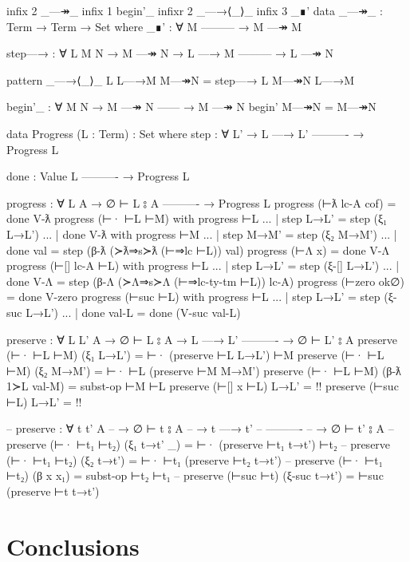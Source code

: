 \documentclass[logo,bsc,singlespacing,parskip,online]{infthesis}
\renewenvironment{code}{\mintedcopy[breaklines,breaksymbolleft=\;]{agda}}{\endmintedcopy}
\begin{document}
\begin{code}
  infix  2 _—↠_
  infix  1 begin'_
  infixr 2 _—→⟨_⟩_
  infix  3 _∎'
  data _—↠_ : Term → Term → Set where
    _∎' : ∀ M
        ---------
      → M —↠ M

    step—→ : ∀ L {M N}
      → M —↠ N
      → L —→ M
        ---------
      → L —↠ N

  pattern _—→⟨_⟩_ L L—→M M—↠N = step—→ L M—↠N L—→M

  begin'_ : ∀ {M N}
    → M —↠ N
      ------
    → M —↠ N
  begin' M—↠N = M—↠N
\end{code}

\begin{code}
  data Progress (L : Term) : Set where
    step : ∀ {L'}
      → L —→ L'
        ----------
      → Progress L

    done :
        Value L
        ----------
      → Progress L

  progress : ∀ {L A}
    → ∅ ⊢ L ⦂ A
      ----------
    → Progress L
  progress (⊢ƛ lc-A cof) = done V-ƛ
  progress (⊢· ⊢L ⊢M) with progress ⊢L
  ... | step L→L' = step (ξ₁ L→L')
  ... | done V-ƛ with progress ⊢M
  ...   | step M→M' = step (ξ₂ M→M')
  ...   | done val  = step (β-ƛ (≻ƛ⇒s≻ƛ (⊢⇒lc ⊢L)) val)
  progress (⊢Λ x) = done V-Λ
  progress (⊢[] lc-A ⊢L) with progress ⊢L
  ... | step L→L' = step (ξ-[] L→L')
  ... | done V-Λ = step (β-Λ (≻Λ⇒s≻Λ (⊢⇒lc-ty-tm ⊢L)) lc-A)
  progress (⊢zero ok∅) = done V-zero
  progress (⊢suc ⊢L) with progress ⊢L
  ... | step L→L'  = step (ξ-suc L→L')
  ... | done val-L = done (V-suc val-L)
\end{code}

\begin{code}

  preserve : ∀ {L L' A}
    → ∅ ⊢ L ⦂ A
    → L —→ L'
      ----------
    → ∅ ⊢ L' ⦂ A
  preserve (⊢· ⊢L ⊢M) (ξ₁ L→L') = ⊢· (preserve ⊢L L→L') ⊢M
  preserve (⊢· ⊢L ⊢M) (ξ₂ M→M') = ⊢· ⊢L (preserve ⊢M M→M')
  preserve (⊢· ⊢L ⊢M) (β-ƛ 1≻L val-M) = subst-op ⊢M ⊢L
  preserve (⊢[] x ⊢L) L→L' = {!!}
  preserve (⊢suc ⊢L) L→L' = {!!}
  
  -- preserve : ∀ {t t' A}
  --   → ∅ ⊢ t ⦂ A
  --   → t —→ t'
  --     ----------
  --   → ∅ ⊢ t' ⦂ A
  -- preserve (⊢· ⊢t₁ ⊢t₂) (ξ₁ t→t' _) = ⊢· (preserve ⊢t₁ t→t') ⊢t₂
  -- preserve (⊢· ⊢t₁ ⊢t₂) (ξ₂ t→t') = ⊢· ⊢t₁  (preserve ⊢t₂ t→t')
  -- preserve (⊢· ⊢t₁ ⊢t₂) (β x x₁) = subst-op ⊢t₂ ⊢t₁
  -- preserve (⊢suc ⊢t) (ξ-suc t→t') = ⊢suc (preserve ⊢t t→t')
\end{code}

\chapter{Conclusions}
\end{document}
